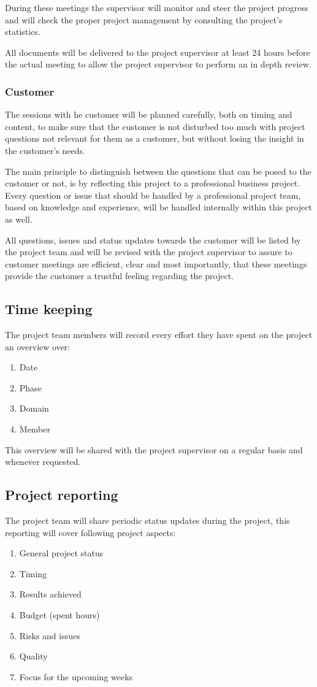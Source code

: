 During these meetings the supervisor will monitor and steer the project progress and will check the proper project management by consulting the project's statistics.

All documents will be delivered to the project supervisor at least 24 hours before the actual meeting to allow the project supervisor to perform an in depth review.

\subsubsection{Customer}
The sessions with he customer will be planned carefully, both on timing and content, to make sure that the customer is not disturbed too much with project questions not relevant for them as a customer, but without losing the insight in the customer's needs.

The main principle to distinguish between the questions that can be posed to the customer or not, is by reflecting this project to a professional business project.
Every question or issue that should be handled by a professional project team, based on knowledge and experience, will be handled internally within this project as well.

All questions, issues and status updates towards the customer will be listed by the project team and will be revised with the project supervisor to assure to customer meetings are efficient, clear and most importantly, that these meetings provide the customer a trustful feeling regarding the project.

\subsection{Time keeping}
The project team members will record every effort they have spent on the project an overview over:
\begin{enumerate}
	\item Date
	\item Phase
	\item Domain
	\item Member
\end {enumerate}
This overview will be shared with the project supervisor on a regular basis and whenever requested.

\subsection{Project reporting}
The project team will share periodic status updates during the project, this reporting will cover following project aspects:
\begin{enumerate}
	\item General project status
	\item Timing
	\item Results achieved
	\item Budget (spent hours)
	\item Risks and issues
	\item Quality
	\item Focus for the upcoming weeks
\end {enumerate}


